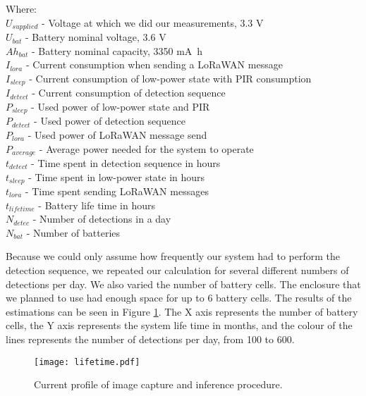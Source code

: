 Where:\\
$U_{supplied}$ - Voltage at which we did our measurements, 3.3 V\\
$U_{bat}$ - Battery nominal voltage, 3.6 V\\
$Ah_{bat}$ - Battery nominal capacity, 3350 \si{\milli\ampere\hour}\\
$I_{lora}$ - Current consumption when sending a LoRaWAN message\\
$I_{sleep}$ - Current consumption of low-power state with PIR consumption\\
$I_{detect}$ - Current consumption of detection sequence\\
$P_{sleep}$ - Used power of low-power state and PIR\\
$P_{detect}$ - Used power of detection sequence\\
$P_{lora}$ - Used power of LoRaWAN message send\\
$P_{average}$ - Average power needed for the system to operate\\
$t_{detect}$ - Time spent in detection sequence in hours\\
$t_{sleep}$ - Time spent in low-power state in hours\\
$t_{lora}$  - Time spent sending LoRaWAN messages\\
$t_{lifetime}$ - Battery life time in hours\\
$N_{detec}$ - Number of detections in a day\\
$N_{bat}$ - Number of batteries

Because we could only assume how frequently our system had to perform the detection sequence, we repeated our calculation for several different numbers of detections per day.
We also varied the number of battery cells.
The enclosure that we planned to use had enough space for up to 6 battery cells.
The results of the estimations can be seen in Figure \ref{lifetime_figure}.
The X axis represents the number of battery cells, the Y axis represents the system life time in months, and the colour of the lines represents the number of detections per day, from 100 to 600.

\begin{figure}[ht]
    \centering
    \texttt{[image: lifetime.pdf]}
    \caption{ Current profile of image capture and inference procedure.}
    \label{lifetime_figure}
\end{figure}

